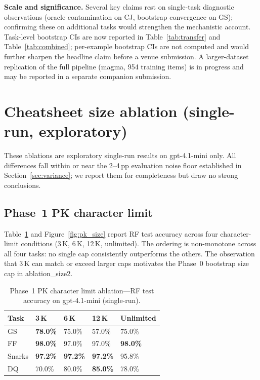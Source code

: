 \documentclass{article}
\begin{document}
\textbf{Scale and significance.}
Several key claims rest on single-task diagnostic observations (oracle contamination on CJ,
bootstrap convergence on GS); confirming these on additional tasks would strengthen the
mechanistic account.
Task-level bootstrap CIs are now reported in Table~\ref{tab:transfer} and Table~\ref{tab:combined};
per-example bootstrap CIs are not computed and would further sharpen the headline claim before
a venue submission.
A larger-dataset replication of the full pipeline (magma, 954 training items) is in progress
and may be reported in a separate companion submission.

\appendix

\section{Cheatsheet size ablation (single-run, exploratory)}
\label{sec:size_appendix}

These ablations are exploratory single-run results on gpt-4.1-mini only.
All differences fall within or near the 2--4\,pp evaluation noise floor established in
Section~\ref{sec:variance}; we report them for completeness but draw no strong conclusions.

\subsection{Phase~1 PK character limit}

Table~\ref{tab:pk_size} and Figure~\ref{fig:pk_size} report RF test accuracy across four
character-limit conditions (3\,K, 6\,K, 12\,K, unlimited).
The ordering is non-monotone across all four tasks: no single cap consistently outperforms
the others.
The observation that 3\,K can match or exceed larger caps motivates the Phase~0 bootstrap
size cap in ablation\_size2.

\begin{table}[h]
  \caption{Phase~1 PK character limit ablation---RF test accuracy on gpt-4.1-mini (single-run).}
  \label{tab:pk_size}
  \centering
  \smallskip
  \begin{tabular}{lllll}
    \toprule
    \textbf{Task} & \textbf{3\,K} & \textbf{6\,K} & \textbf{12\,K} & \textbf{Unlimited} \\
    \midrule
    GS     & \textbf{78.0\%} & 75.0\% & 57.0\% & 75.0\% \\
    FF     & \textbf{98.0\%} & 97.0\% & 97.0\% & \textbf{98.0\%} \\
    Snarks & \textbf{97.2\%} & \textbf{97.2\%} & \textbf{97.2\%} & 95.8\% \\
    DQ     & 70.0\% & 80.0\% & \textbf{85.0\%} & 78.0\% \\
    \bottomrule
  \end{tabular}
\end{table}
\end{document}
